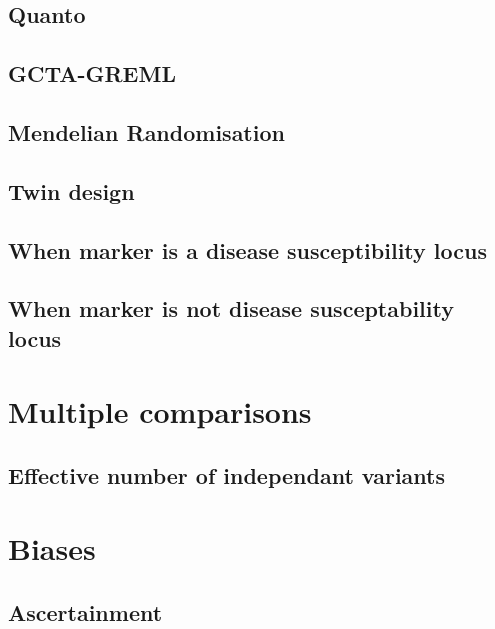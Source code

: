 \documentclass[]{book}
\theoremstyle{definition}
\theoremstyle{definition}
\theoremstyle{definition}
\theoremstyle{remark}
\begin{document}
\subsection{Quanto}\label{quanto}

\subsection{GCTA-GREML}\label{gcta-greml}

\subsection{Mendelian Randomisation}\label{mendelian-randomisation}

\subsection{Twin design}\label{twin-design}

\subsection{When marker is a disease susceptibility
locus}\label{when-marker-is-a-disease-susceptibility-locus}

\subsection{When marker is not disease susceptability
locus}\label{when-marker-is-not-disease-susceptability-locus}

\section{Multiple comparisons}\label{multiple-comparisons}

\subsection{Effective number of independant
variants}\label{effective-number-of-independant-variants}

\section{Biases}\label{biases}

\subsection{Ascertainment}\label{ascertainment}
\end{document}
